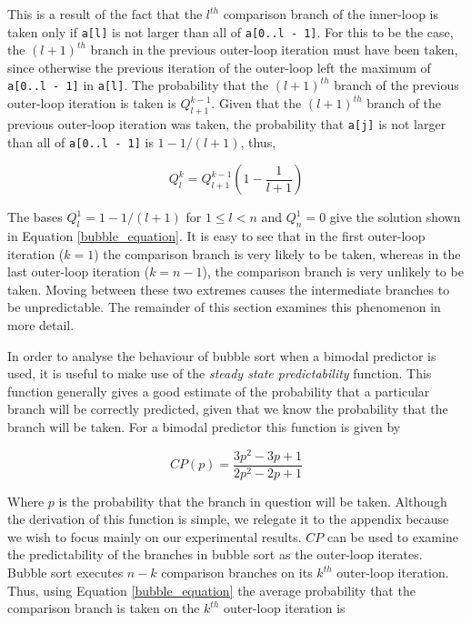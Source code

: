 \documentclass[acmtocl]{acmtrans2m}
\begin{document}
\noindent
This is a result of the fact that the $l^{th}$ comparison branch of the
inner-loop is taken only if \texttt{a[l]} is not larger than all of
\texttt{a[0..l - 1]}.  For this to be the case, the $(l + 1)^{th}$ branch in the
previous outer-loop iteration must have been taken, since otherwise the previous
iteration of the outer-loop left the maximum of \texttt{a[0..l - 1]} in
\texttt{a[l]}.  The probability that the $(l + 1)^{th}$ branch of the
previous outer-loop iteration is taken is $Q^{k - 1}_{l + 1}$. Given that the
$(l + 1)^{th}$ branch of the previous outer-loop iteration was taken, the
probability that \texttt{a[j]} is not larger than all of \texttt{a[0..l - 1]} is
$1 - 1/(l + 1)$, thus,

\[
Q^k_l = Q^{k-1}_{l+1}\left(1 - \frac{1}{l + 1} \right)
\] 

\noindent
The bases $Q^{1}_l = 1 - 1 / (l + 1)$ for $1 \leq l < n$ and $Q^1_n = 0$ give
the solution shown in Equation \ref{bubble_equation}.  It is easy to see that in
the first outer-loop iteration ($k = 1$) the comparison branch is very likely to
be taken, whereas in the last outer-loop iteration ($k = n - 1$), the comparison
branch is very unlikely to be taken. Moving between these two extremes causes
the intermediate branches to be unpredictable. The remainder of this section
examines this phenomenon in more detail.

In order to analyse the behaviour of bubble sort when a bimodal predictor is
used, it is useful to make use of the \textit{steady state predictability}
function. This function generally gives a good estimate of the probability that
a particular branch will be correctly predicted, given that we know the
probability that the branch will be taken. For a bimodal predictor this function
is given by

\begin{equation}
CP(p) = \frac{3p^2 - 3p + 1}{2p^2 - 2p + 1}
\label{CP_equation}
\end{equation}

\noindent Where $p$ is the probability that the branch in question will be
taken. Although the derivation of this function is simple, we relegate it to the
appendix because we wish to focus mainly on our experimental results. $CP$ can
be used to examine the predictability of the branches in bubble sort as the
outer-loop iterates.  Bubble sort executes $n - k$ comparison branches on its
$k^{th}$ outer-loop iteration. Thus, using Equation \ref{bubble_equation} the
average probability that the comparison branch is taken on the $k^{th}$
outer-loop iteration is 
\end{document}
